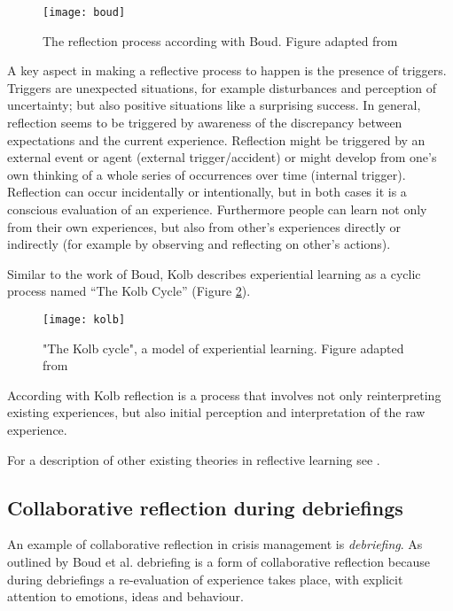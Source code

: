 \begin{figure}
	[tbh] \centering 
	\texttt{[image: boud]} \caption{The reflection process according with Boud. Figure adapted from \protect\autocite{boud1985reflection}} \label{fig:boud-model} 
\end{figure}

A key aspect in making a reflective process to happen is the presence of triggers. Triggers are unexpected situations, for example disturbances and perception of uncertainty; but also positive situations like a surprising success. In general, reflection seems to be triggered by awareness of the discrepancy between expectations and the current experience. Reflection might be triggered by an external event or agent (external trigger/accident) or might develop from one's own thinking of a whole series of occurrences over time (internal trigger). Reflection can occur incidentally or intentionally, but in both cases it is a conscious evaluation of an experience. Furthermore people can learn not only from their own experiences, but also from other's experiences directly or indirectly (for example by observing and reflecting on other's actions).

Similar to the work of Boud, Kolb describes experiential learning as a cyclic process named ``The Kolb Cycle'' (Figure \ref{fig:kolb-model}).

\begin{figure}
	[tbh] \centering 
	\texttt{[image: kolb]} \caption{"The Kolb cycle", a model of experiential learning. Figure adapted from \protect\autocite{kolb1984organizational}} \label{fig:kolb-model} 
\end{figure}

According with Kolb \autocite*{kolb1984experiential} reflection is a process that involves not only reinterpreting existing experiences, but also initial perception and interpretation of the raw experience.

For a description of other existing theories in reflective learning see \autocite{WoodDaudelin199636}.

\subsection{Collaborative reflection during debriefings}\label{debriefing-crisis-management-work-an-example-of-collaborative-reflection}

An example of collaborative reflection in crisis management is \emph{debriefing}. As outlined by Boud et al. \autocite*{boud1985reflection} debriefing is a form of collaborative reflection because during debriefings a re-evaluation of experience takes place, with explicit attention to emotions, ideas and behaviour.

